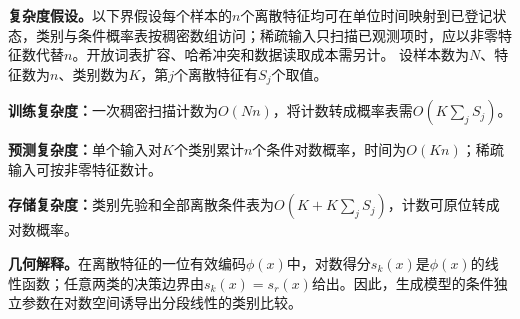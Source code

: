 \begin{complexitybox}
\textbf{复杂度假设。}以下界假设每个样本的$n$个离散特征均可在单位时间映射到已登记状态，类别与条件概率表按稠密数组访问；稀疏输入只扫描已观测项时，应以非零特征数代替$n$。开放词表扩容、哈希冲突和数据读取成本需另计。
设样本数为$N$、特征数为$n$、类别数为$K$，第$j$个离散特征有$S_j$个取值。

\textbf{训练复杂度：}一次稠密扫描计数为$O(Nn)$，将计数转成概率表需$O(K\sum_jS_j)$。

\textbf{预测复杂度：}单个输入对$K$个类别累计$n$个条件对数概率，时间为$O(Kn)$；稀疏输入可按非零特征数计。

\textbf{存储复杂度：}类别先验和全部离散条件表为$O(K+K\sum_jS_j)$，计数可原位转成对数概率。
\end{complexitybox}

\label{struct:V2-C03-CH14}
\begin{geometrybox}
\textbf{几何解释。}在离散特征的一位有效编码$\phi(x)$中，对数得分$s_k(x)$是$\phi(x)$的线性函数；任意两类的决策边界由$s_k(x)=s_r(x)$给出。因此，生成模型的条件独立参数在对数空间诱导出分段线性的类别比较。
\end{geometrybox}

